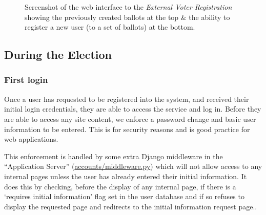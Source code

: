 \documentclass{article}
\begin{document}
\begin{figure}[h]
	\noindent
	\vspace{-0.5cm}
	\caption{Screenshot of the web interface to the \textit{External Voter Registration} showing the previously created ballots at the top \& the ability to register a new user (to a set of ballots) at the bottom.}
\end{figure}


\cleardoublepage
\subsection{During the Election}
\subsubsection{First login}
Once a user has requested to be registered into the system, and received their initial login credentials, they are able to access the service and log in. Before they are able to access any site content, we enforce a password change and basic user information to be entered. This is for security reasons and is good practice for web applications.

This enforcement is handled by some extra Django middleware in the ``Application Server'' (\href{https://github.com/Mattie432/Blockchain-Voting-System/blob/master/Programming/2_ApplicationServer/accounts/middleware.py}{accounts/middleware.py}) which will not allow access to any internal pages unless the user has already entered their initial information. It does this by checking, before the display of any internal page, if there is a `requires initial information' flag set in the user database and if so refuses to display the requested page and redirects to the initial information request page..
\end{document}
